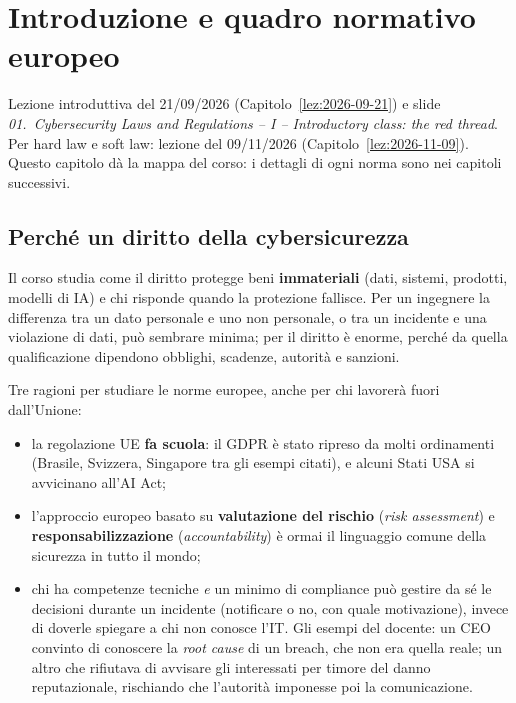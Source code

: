 \chapter{Introduzione e quadro normativo europeo}
\label{cap:introduzione}

\begin{nota}[Fonti]
Lezione introduttiva del 21/09/2026 (Capitolo~\ref{lez:2026-09-21}) e slide \emph{01.~Cybersecurity
Laws and Regulations -- I -- Introductory class: the red thread}. Per hard law e soft law: lezione del
09/11/2026 (Capitolo~\ref{lez:2026-11-09}). Questo capitolo dà la mappa del corso: i dettagli di ogni
norma sono nei capitoli successivi.
\end{nota}

\section{Perché un diritto della cybersicurezza}
\label{sec:intro-perche}

Il corso studia come il diritto protegge beni \textbf{immateriali} (dati, sistemi, prodotti, modelli di
IA) e chi risponde quando la protezione fallisce. Per un ingegnere la differenza tra un dato personale e
uno non personale, o tra un incidente e una violazione di dati, può sembrare minima; per il diritto è
enorme, perché da quella qualificazione dipendono obblighi, scadenze, autorità e sanzioni.

Tre ragioni per studiare le norme europee, anche per chi lavorerà fuori dall'Unione:
\begin{itemize}
  \item la regolazione UE \textbf{fa scuola}: il GDPR è stato ripreso da molti ordinamenti (Brasile,
    Svizzera, Singapore tra gli esempi citati), e alcuni Stati USA si avvicinano all'AI Act;
  \item l'approccio europeo basato su \textbf{valutazione del rischio} (\emph{risk assessment}) e
    \textbf{responsabilizzazione} (\emph{accountability}) è ormai il linguaggio comune della sicurezza
    in tutto il mondo;
  \item chi ha competenze tecniche \emph{e} un minimo di compliance può gestire da sé le decisioni
    durante un incidente (notificare o no, con quale motivazione), invece di doverle spiegare a chi non
    conosce l'IT. Gli esempi del docente: un CEO convinto di conoscere la \emph{root cause} di un
    breach, che non era quella reale; un altro che rifiutava di avvisare gli interessati per timore del
    danno reputazionale, rischiando che l'autorità imponesse poi la comunicazione.
\end{itemize}

